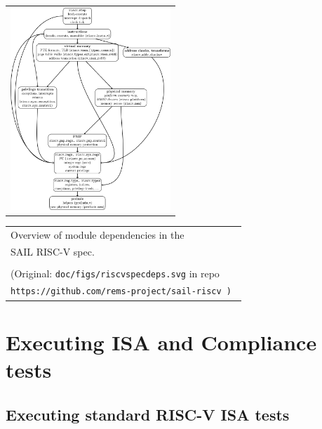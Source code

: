 \documentclass[aspectratio=169]{beamer}
\newcommand{\hm}{\hspace*{1em}}
\newcommand{\hmmm}{\hspace*{3em}}
\newcommand{\slidefont}{\scriptsize}
\begin{document}

\begin{frame}
  \slidefont

  \begin{tabular}[c]{l}
    \includegraphics[height=3in]{Figures/riscvspecdeps.png}
  \end{tabular}
  \hmmm
  \begin{tabular}[c]{l}
    Overview of module dependencies in the \\
    SAIL RISC-V spec. \\
    \\
    \tiny (Original: {\tt doc/figs/riscvspecdeps.svg} in repo \\
    \hm\tiny\tt https://github.com/rems-project/sail-riscv )
  \end{tabular}

\end{frame}


\section{Executing ISA and Compliance tests}


\subsection{Executing standard RISC-V ISA tests}

\end{document}
